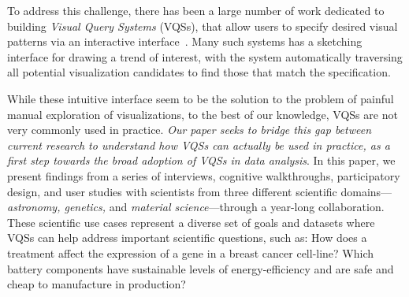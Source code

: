 \par To address this challenge, there has been a large number of work dedicated to building {\em Visual Query Systems} (VQSs), that allow users to specify desired visual patterns via an interactive interface~\cite{mohebbi2011google,Hochheiser2004,wattenberg2001sketching,Siddiqui2017VLDB,ryall2005querylines}. Many such systems has a sketching interface for drawing a trend of interest, with the system automatically traversing all potential visualization candidates to find those that match the specification.
\par While these intuitive interface seem to be the solution to the problem of painful manual exploration of visualizations, to the best of our knowledge, VQSs are not very commonly used in practice. {\em Our paper seeks to bridge this gap between current research to understand how VQSs can actually be used in practice, as a first step towards the broad adoption of VQSs in data analysis}. In this paper, we present findings from a series of interviews, cognitive walkthroughs, participatory design, and user studies with scientists from three different scientific domains---{\em astronomy, genetics,} and {\em material science}---through a year-long collaboration. These scientific use cases represent a diverse set of goals and datasets where VQSs can help address important scientific questions, such as: How does a treatment affect the expression of a gene in a breast cancer cell-line? Which battery components have sustainable levels of energy-efficiency and are safe and cheap to manufacture in production?
